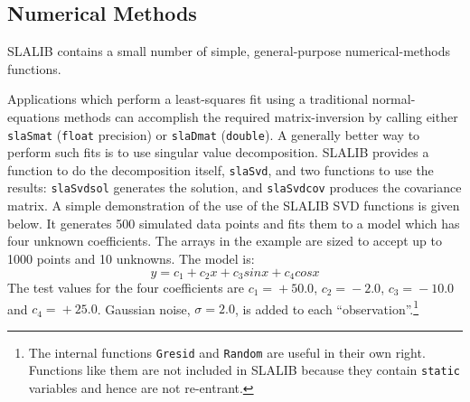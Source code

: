 \documentclass[11pt,fleqn,twoside]{article}
\renewcommand{\_}{{\tt\char'137}}     %
\begin{document}
\subsection{Numerical Methods}
SLALIB contains a small number of simple, general-purpose
numerical-methods functions.

Applications which perform a least-squares fit using a traditional
normal-equations methods can accomplish the required matrix-inversion
by calling either
{\tt slaSmat}
({\tt float} precision) or
{\tt slaDmat}
({\tt double}).  A generally better way to perform such fits is
to use singular value decomposition.  SLALIB provides a function
to do the decomposition itself,
{\tt slaSvd},
and two functions to use the results:
{\tt slaSvdsol}
generates the solution, and
{\tt slaSvdcov}
produces the covariance matrix.
A simple demonstration of the use of the SLALIB SVD
functions is given below.  It generates 500 simulated data
points and fits them to a model which has four unknown coefficients.
The arrays in the example are sized to accept up to 1000
points and 10 unknowns.  The model is:
\[ y = c_{1} +c_{2}x +c_{3}sin{x} +c_{4}cos{x} \]
The test values for the four coefficients are
$c_1\!=\!+50.0$,
$c_2\!=\!-2.0$,
$c_3\!=\!-10.0$ and
$c_4\!=\!+25.0$.
Gaussian noise, $\sigma=2.0$, is added to each
``observation''.\footnote{The internal functions {\tt Gresid}
and {\tt Random} are useful in their own right.  Functions like them
are not included in SLALIB because they contain
{\tt static} variables and hence are not re-entrant.}
\vspace{-3ex}
\goodbreak
\end{document}
